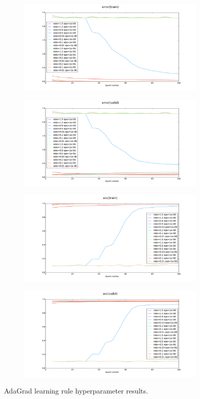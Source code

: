 \documentclass[12pt]{article}
\begin{document}
\begin{figure}[h]
\centering
\begin{subfigure}{.5\textwidth}
  \centering
  \includegraphics[width=9.1cm]{Task3/figures/Ada_error(train).pdf}
\end{subfigure}%
\begin{subfigure}{.5\textwidth}
  \centering
  \includegraphics[width=9.1cm]{Task3/figures/Ada_error(valid).pdf}
\end{subfigure}%
\end{figure}
\begin{figure}[h]
\centering
\begin{subfigure}{.5\textwidth}
  \centering
  \includegraphics[width=9.1cm]{Task3/figures/Ada_acc(train).pdf}
\end{subfigure}%
\begin{subfigure}{.5\textwidth}
  \centering
  \includegraphics[width=9.1cm]{Task3/figures/Ada_acc(valid).pdf}
\end{subfigure}%
  \caption{AdaGrad learning rule hyperparameter results.}
  \label{fig:Ada}
\end{figure}
\end{document}
